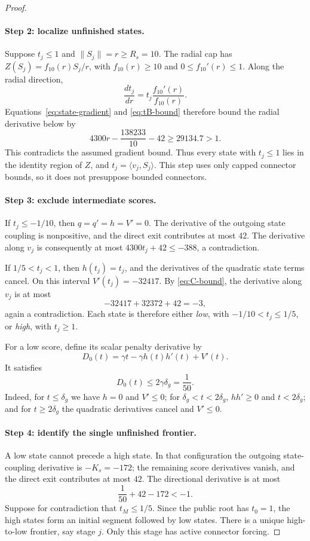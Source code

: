 \documentclass[11pt,letterpaper]{article}
\theoremstyle{definition}
\theoremstyle{remark}
\begin{document}
\begin{proof}
\paragraph{Step 2: localize unfinished states.}
Suppose $t_j\le1$ and $\|S_j\|=r\ge R_s=10$. The radial cap has
$Z(S_j)=f_{10}(r)S_j/r$, with $f_{10}(r)\ge10$ and
$0\le f_{10}'(r)\le1$. Along the radial direction,
\[
 \frac{dt_j}{dr}=t_j\frac{f_{10}'(r)}{f_{10}(r)}.
\]
Equations~\eqref{eq:state-gradient} and \eqref{eq:tB-bound} therefore
bound the radial derivative below by
\[
 4300r-\frac{138233}{10}-42\ge29134.7>1.
\]
This contradicts the assumed gradient bound. Thus every state with
$t_j\le1$ lies in the identity region of $Z$, and
$t_j=\langle v_j,S_j\rangle$. This step uses only capped connector bounds,
so it does not presuppose bounded connectors.

\paragraph{Step 3: exclude intermediate scores.}
If $t_j\le-1/10$, then $q=q'=h=V'=0$. The derivative of the outgoing
state coupling is nonpositive, and the direct exit contributes at most
$42$. The derivative along $v_j$ is consequently at most
$4300t_j+42\le-388$, a contradiction.

If $1/5<t_j<1$, then $h(t_j)=t_j$, and the derivatives of the quadratic
state terms cancel. On this interval $V'(t_j)=-32417$. By
\eqref{eq:C-bound}, the derivative along $v_j$ is at most
\[
 -32417+32372+42=-3,
\]
again a contradiction. Each state is therefore either
\emph{low}, with $-1/10<t_j\le1/5$, or \emph{high}, with $t_j\ge1$.

For a low score, define its scalar penalty derivative by
\[
 D_0(t)=\gamma t-\gamma h(t)h'(t)+V'(t).
\]
It satisfies
\begin{equation}
 D_0(t)\le2\gamma\delta_g=\frac1{50}.
 \label{eq:low-penalty}
\end{equation}
Indeed, for $t\le\delta_g$ we have $h=0$ and $V'\le0$; for
$\delta_g<t<2\delta_g$, $hh'\ge0$ and $t<2\delta_g$; and for
$t\ge2\delta_g$ the quadratic derivatives cancel and $V'\le0$.

\paragraph{Step 4: identify the single unfinished frontier.}
A low state cannot precede a high state. In that configuration the outgoing
state-coupling derivative is $-K_s=-172$; the remaining score derivatives
vanish, and the direct exit contributes at most $42$. The directional
derivative is at most
\[
 \frac1{50}+42-172<-1.
\]
Suppose for contradiction that $t_M\le1/5$. Since the public root has
$t_0=1$, the high states form an initial segment followed by low states.
There is a unique high-to-low frontier, say stage $j$. Only this stage has
active connector forcing.


\end{proof}
\end{document}
